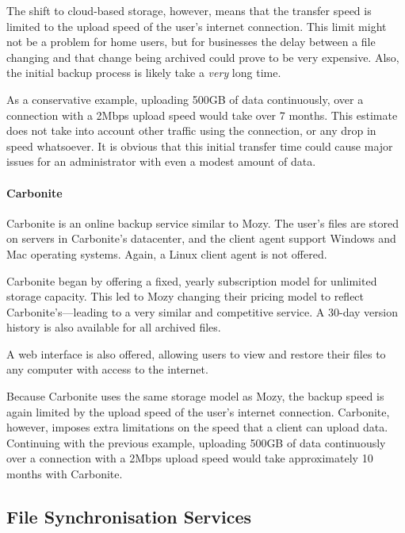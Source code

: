 \begin{bibunit}[plain]
The shift to cloud-based storage, however, means that the transfer speed is limited to the upload speed
of the user's internet connection. This limit might not be
a problem for home users, but for businesses the delay between a file changing
and that change being archived could prove to be very expensive. Also, the
initial backup process is likely take a \emph{very} long time.

As a conservative example, uploading 500GB of data continuously, over
a connection with a 2Mbps upload speed would take over 7 months. This estimate
does not take into account other traffic using the connection, or any drop in
speed whatsoever. It is obvious that this initial transfer time could cause
major issues for an administrator with even a modest amount of data.

\paragraph{Carbonite}

Carbonite is an online backup service similar to Mozy. The user's files are
stored on servers in Carbonite's datacenter, and the client agent support
Windows and Mac operating systems. Again, a Linux client agent is not
offered\cite{Carbonite}.

Carbonite began by offering a fixed, yearly subscription model for unlimited
storage capacity. This led to Mozy changing their pricing model to reflect
Carbonite's---leading to a very similar and competitive
service\cite{Carbonite-report}. A 30-day version history is also available for
all archived files\cite{Carbonite}.

A web interface is also offered, allowing users to view and restore their files
to any computer with access to the internet\cite{Carbonite}.

Because Carbonite uses the same storage model as Mozy, the backup speed is
again limited by the upload speed of the user's internet connection. Carbonite,
however, imposes extra limitations on the speed that a client can upload
data\cite{Carbonite-limits}. Continuing with the previous example, uploading
500GB of data continuously over a connection with a 2Mbps upload speed would
take approximately 10 months with Carbonite.

\subsection{File Synchronisation Services}


\end{bibunit}
